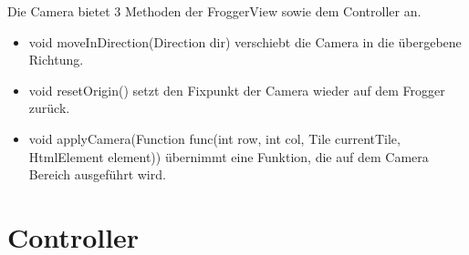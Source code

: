 \documentclass[a4paper,10pt]{report}
\begin{document}
{{			\noindent			
			Die Camera bietet 3 Methoden der FroggerView sowie dem Controller an.
			
			\begin{itemize}
				\item void moveInDirection(Direction dir) verschiebt die Camera in die übergebene Richtung.
				\item void resetOrigin() setzt den Fixpunkt der Camera wieder auf dem Frogger zurück.
				\item void applyCamera(Function func(int row, int col, Tile currentTile, HtmlElement element)) übernimmt eine Funktion, die auf dem Camera Bereich ausgeführt wird.
			\end{itemize}							
		}   	
    }
    
    \section{Controller}
\end{document}
